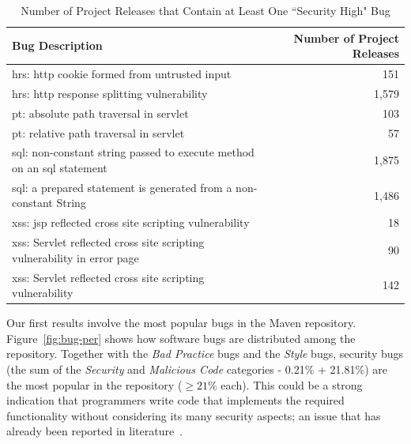 \documentclass[letterpaper,twocolumn,10pt]{article}
\begin{document}
\begin{table}[t]
\centering
\caption{Number of Project Releases that Contain at Least One ``Security
  High" Bug}
\label{tbl:sev}
\leavevmode
	\begin{tabular}{p{31em} r}
	\hline
	Bug Description & Number of Project Releases\\
 	\hline
	{\sc hrs}: {\sc http} cookie formed from untrusted input & 151\\
	{\sc hrs}: {\sc http} response splitting vulnerability & 1,579\\
	{\sc pt}: absolute path traversal in servlet  & 103\\
	{\sc pt}: relative path traversal in servlet & 57\\
	{\sc sql}: non-constant string passed to execute method on an {\sc sql} statement & 1,875\\
	{\sc sql}: a prepared statement is generated from a non-constant String & 1,486\\
	{\sc xss}: {\sc jsp} reflected cross site scripting vulnerability & 18\\
	{\sc xss}: Servlet reflected cross site scripting vulnerability in error page & 90\\
	{\sc xss}: Servlet reflected cross site scripting vulnerability & 142\\
	\hline
	\end{tabular}
\end{table}

Our first results involve the most popular bugs in the Maven repository.
Figure~\ref{fig:bug-per} shows how software bugs are distributed among the
repository. Together with the {\it Bad Practice} bugs and the {\it Style} bugs,
security bugs (the sum of the {\it Security} and {\it Malicious Code}
categories - 0.21\% + 21.81\%) are the most popular in the repository ($\geq 21\%$ each).
This could be a strong indication that programmers write code
that implements the required functionality without considering its many
security aspects; an issue that has already been reported in
literature~\cite{SH09}.
\end{document}
